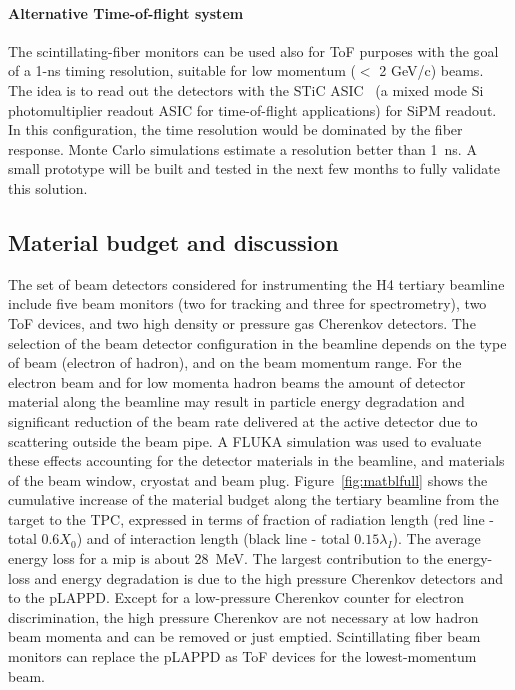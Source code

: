 \paragraph{Alternative Time-of-flight system}
The  scintillating-fiber monitors can be used also for ToF purposes with the goal of a 1-ns timing resolution, suitable for low momentum ($<$ 2 GeV/c) beams. 
The idea is to read out the detectors with the STiC ASIC~\cite{STIC} (a mixed mode Si photomultiplier readout ASIC for time-of-flight applications) for SiPM readout. 
In this configuration, the time resolution would be dominated by the fiber response. Monte Carlo simulations estimate a resolution better than 1~ns. 
A small prototype will be built and tested in the next few months to fully validate this solution.

\subsection{Material budget and discussion}
\label{beam-material-budget}
The set of beam detectors considered for instrumenting the H4 tertiary beamline include
 five beam monitors (two for tracking and three for spectrometry), two ToF devices, and two high density or pressure gas Cherenkov detectors. The selection of the beam detector configuration in the beamline depends on the type of beam (electron of hadron), and on the beam momentum range. For the electron beam and for low momenta hadron beams the amount of detector material along the beamline may result in particle energy degradation and significant reduction of the beam rate delivered at the active detector due to scattering outside the beam pipe. A FLUKA\cite{Ferrari:2005zk,Fluka15} 
 simulation was used to evaluate these effects accounting for the 
 detector materials in the beamline, and materials of the beam window, cryostat and beam plug. Figure~\ref{fig:matblfull} shows the cumulative increase of the material budget along the tertiary  
beamline from the target to the TPC, expressed in terms of fraction of radiation length (red line - total  $0.6X_0$) and of interaction length (black line - total  $0.15 \lambda_I$). The average energy loss for a mip is about 28~MeV.
 The largest contribution to the energy-loss and energy degradation is due to the high pressure Cherenkov detectors and to the pLAPPD. Except for a low-pressure Cherenkov counter for electron discrimination, the high pressure Cherenkov are not necessary at low hadron beam momenta  and can be removed or just emptied. Scintillating fiber beam monitors can replace the pLAPPD as ToF devices for the lowest-momentum beam. 

